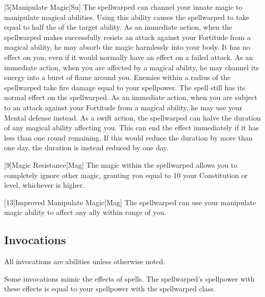        [5]{Manipulate Magic}[Su]
        The spellwarped can channel your innate magic to manipulate magical abilities.
        Using this ability causes the spellwarped to take  equal to half the  of the target ability.
        As an immediate action, when the spellwarped makes successfully resists an attack against your Fortitude from a magical ability, he may absorb the magic harmlessly into your body.
        It has no effect on you, even if it would normally have an effect on a failed attack.
        As an immediate action, when you are affected by a magical ability, he may channel its energy into a burst of flame around you.
        Enemies within a \areamed radius of the spellwarped take fire damage equal to your spellpower.
        The spell still has its normal effect on the spellwarped.
        As an immediate action, when you are subject to an attack against your Fortitude from a magical ability, he may use your Mental defense instead.
        As a swift action, the spellwarped can halve the duration of any magical ability affecting you.
        This can end the effect immediately if it has less than one round remaining.
        If this would reduce the duration by more than one day, the duration is instead reduced by one day.

        [9]{Magic Resistance}[Mag]
        The magic within the spellwarped allows you to completely ignore other magic, granting you  equal to 10 \add your Constitution or level, whichever is higher.

        [13]{Improved Manipulate Magic}[Mag]
        The spellwarped can use your manipulate magic ability to affect any ally within \rngmed range of you.

    \subsection{Invocations}\label{Invocations}

        All invocations are  abilities unless otherwise noted.

        Some invocations mimic the effects of spells.
        The spellwarped's spellpower with these effects is equal to your spellpower with the spellwarped class.

